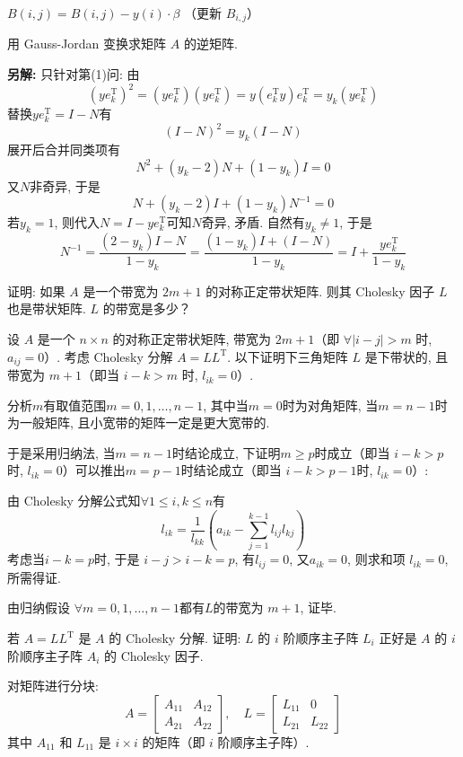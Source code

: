 \documentclass[12pt, answers]{exam}     %
\newcommand{\anothersolution}{\par\noindent\textbf{另解:}}
\newcommand{\T}{\mathrm{T}}
\begin{document}
\begin{questions}
\begin{solution}
\begin{algorithm}[H]
{{{{                $B(i, j) = B(i, j) - y(i) \cdot \beta$ （更新 $B_{i,j}$）\\
            }
        }
    }
}
\caption{用 Gauss-Jordan 变换求矩阵 $A$ 的逆矩阵.}
\end{algorithm}
\anothersolution{}
只针对第(1)问: 由 \[(y e_k^{\T})^2 = (y e_k^{\T})(y e_k^{\T}) = y (e_k^{\T} y) e_k^{\T} = y_k (y e_k^{\T})\]
替换$y e_k^{\T} = I - N$有
\[ (I - N)^2 = y_k (I - N) \]
展开后合并同类项有
\[ N^2 + (y_k - 2)N + (1 - y_k)I = 0 \]
又$N$非奇异, 于是
\[ N + (y_k - 2)I + (1 - y_k)N^{-1} = 0 \]
若$y_k = 1$, 则代入$N = I - y e_k^{\T}$可知$N$奇异, 矛盾. 自然有$y_k \neq 1$, 于是
\[ N^{-1} = \frac{(2 - y_k)I - N}{1 - y_k} = \frac{(1 - y_k)I + (I - N)}{1 - y_k} = I + \frac{y e_k^{\T}}{1 - y_k} \]
\end{solution}

\question{}
证明: 如果 \( A \) 是一个带宽为 \( 2m+1 \) 的对称正定带状矩阵. 则其 Cholesky 因子 \( L \) 也是带状矩阵. \( L \) 的带宽是多少？
\begin{solution}
设 \( A \) 是一个 \( n \times n \) 的对称正定带状矩阵, 带宽为 \( 2m + 1 \)（即 \( \forall |i-j| > m \) 时, \( a_{ij} = 0 \)）. 
考虑 Cholesky 分解 \( A = LL^{\T} \). 以下证明下三角矩阵 \( L \) 是下带状的, 且带宽为 \( m+1 \)（即当 \( i - k > m \) 时, \( l_{ik} = 0 \)）. 

分析$m$有取值范围\( m = 0, 1, \ldots, n - 1 \), 其中当\( m = 0 \)时为对角矩阵, 当\( m = n - 1 \)时为一般矩阵, 且小宽带的矩阵一定是更大宽带的.

于是采用归纳法, 当\( m = n - 1 \)时结论成立, 下证明\( m \geq p \)时成立（即当 \( i - k > p \)时,  \( l_{ik} = 0 \)）可以推出\( m = p - 1 \)时结论成立（即当 \( i - k > p - 1 \)时,  \( l_{ik} = 0 \)）:

由 Cholesky 分解公式知\( \forall 1 \le i, k \le n \)有
\[
l_{ik} = \frac{1}{l_{kk}} \left( a_{ik} - \sum_{j=1}^{k-1} l_{ij} l_{kj} \right)
\]
考虑当\( i - k = p \)时, 于是 \( i - j > i - k = p \), 有\( l_{ij} = 0 \), 又\( a_{ik} = 0 \), 则求和项 \( l_{ik} = 0 \), 所需得证.

由归纳假设 \( \forall m = 0, 1, \ldots, n - 1 \)都有$L$的带宽为 \( m+1 \), 证毕.
\end{solution}

\question{}若 \( A = LL^{\T} \) 是 \( A \) 的 Cholesky 分解. 证明: \( L \) 的 \( i \) 阶顺序主子阵 \( L_i \) 正好是 \( A \) 的 \( i \) 阶顺序主子阵 \( A_i \) 的 Cholesky 因子. 
\begin{solution}
对矩阵进行分块:
\[
A = \begin{bmatrix}
A_{11} & A_{12} \\
A_{21} & A_{22}
\end{bmatrix}, \quad
L = \begin{bmatrix}
L_{11} & 0 \\
L_{21} & L_{22}
\end{bmatrix}
\]
其中 \( A_{11} \) 和 \( L_{11} \) 是 \( i \times i \) 的矩阵（即 \( i \) 阶顺序主子阵）.


\end{solution}
\end{questions}
\end{document}
